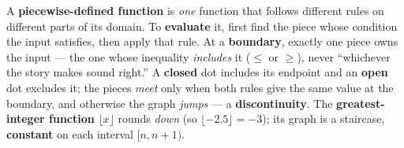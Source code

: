 \documentclass[12pt]{article}
\begin{document}
\vspace{0.14in}

\boxguard[8]
\begin{remindbox}
\small
A \textbf{piecewise-defined function} is \emph{one} function that follows different rules on
different parts of its domain. To \textbf{evaluate} it, first find the piece whose condition the
input satisfies, then apply that rule. At a \textbf{boundary}, exactly one piece owns the input ---
the one whose inequality \emph{includes} it ($\le$ or $\ge$), never ``whichever the story makes
sound right.'' A \textbf{closed} dot includes its endpoint and an \textbf{open} dot excludes it;
the pieces \emph{meet} only when both rules give the same value at the boundary, and otherwise the
graph \emph{jumps} --- a \textbf{discontinuity}. The \textbf{greatest-integer function}
$\lfloor x\rfloor$ rounds \emph{down} (so $\lfloor -2.5\rfloor=-3$); its graph is a staircase,
\textbf{constant} on each interval $[n,n+1)$.
\end{remindbox}
\end{document}
